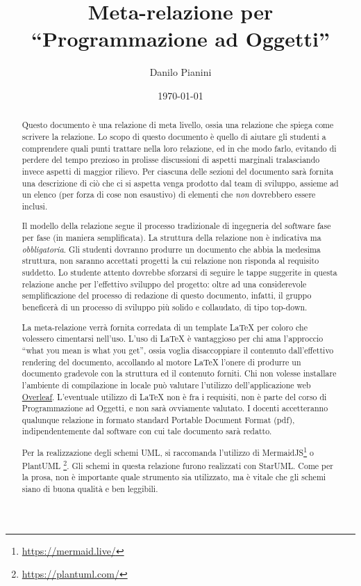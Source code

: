 \documentclass[a4paper,12pt]{report}
\title{Meta-relazione per\\``Programmazione ad Oggetti''}
\author{Danilo Pianini}
\date{\today}
\begin{document}
\maketitle

\begin{abstract}
Questo documento è una relazione di meta livello, ossia una relazione che spiega come scrivere la relazione.
%
Lo scopo di questo documento è quello di aiutare gli studenti a comprendere quali punti trattare nella loro relazione, ed in che modo farlo, evitando di perdere del tempo prezioso in prolisse discussioni di aspetti marginali tralasciando invece aspetti di maggior rilievo.
%
Per ciascuna delle sezioni del documento sarà fornita una descrizione di ciò che ci si aspetta venga prodotto dal team di sviluppo, assieme ad un elenco (per forza di cose non esaustivo) di elementi che \emph{non} dovrebbero essere inclusi.

Il modello della relazione segue il processo tradizionale di ingegneria del software fase per fase (in maniera semplificata).
%
La struttura della relazione non è indicativa ma \textit{obbligatoria}.
%
Gli studenti dovranno produrre un documento che abbia la medesima struttura, non saranno accettati progetti la cui relazione non risponda al requisito suddetto.
%
Lo studente attento dovrebbe sforzarsi di seguire le tappe suggerite in questa relazione anche per l'effettivo sviluppo del progetto: oltre ad una considerevole semplificazione del processo di redazione di questo documento, infatti, il gruppo beneficerà di un processo di sviluppo più solido e collaudato, di tipo top-down.

La meta-relazione verrà fornita corredata di un template \LaTeX{} per coloro che volessero cimentarsi nell'uso.
%
L'uso di \LaTeX{} è vantaggioso per chi ama l'approccio ``what you mean is what you get'', ossia voglia disaccoppiare il contenuto dall'effettivo rendering del documento, accollando al motore \LaTeX{} l'onere di produrre un documento gradevole con la struttura ed il contenuto forniti.
%
Chi non volesse installare l'ambiente di compilazione in locale può valutare l'utilizzo dell'applicazione web \href{https://www.overleaf.com/}{Overleaf}.
%
L'eventuale utilizzo di \LaTeX{} non è fra i requisiti,
non è parte del corso di Programmazione ad Oggetti, e non sarà ovviamente valutato.
%
I docenti accetteranno qualunque relazione in formato standard Portable Document Format (pdf), indipendentemente dal software con cui tale documento sarà redatto.

Per la realizzazione degli schemi UML, si raccomanda l'utilizzo di MermaidJS\footnote{\url{https://mermaid.live/}} o PlantUML \footnote{\url{https://plantuml.com/}}.
%
Gli schemi in questa relazione furono realizzati con StarUML.
%
Come per la prosa, non è importante quale strumento sia utilizzato, ma è vitale che gli schemi siano di buona qualità e ben leggibili.

\end{abstract}
\end{document}
